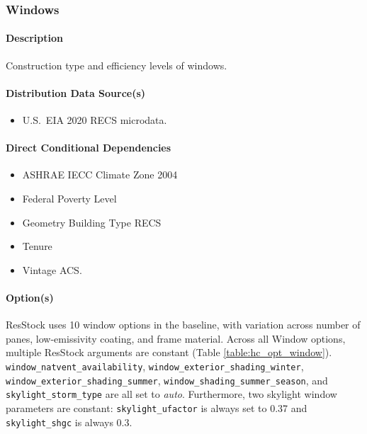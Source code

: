 \subsubsection{Windows}\label{windows}
\paragraph{Description}
Construction type and efficiency levels of windows.
\paragraph{Distribution Data Source(s)}
\begin{itemize}
 
\item
  U.S.~EIA 2020 RECS microdata.
\end{itemize}

\paragraph{Direct Conditional Dependencies}

\begin{itemize}
    \item ASHRAE IECC Climate Zone 2004
    \item Federal Poverty Level
    \item Geometry Building Type RECS
    \item Tenure
    \item Vintage ACS.
\end{itemize}

\paragraph{Option(s)}
ResStock uses 10 window options in the baseline, with variation across number of panes, low-emissivity coating, and frame material. Across all Window options, multiple ResStock arguments are constant (Table \ref{table:hc_opt_window}). \texttt{window\_natvent\_availability},
\texttt{window\_exterior\_shading\_winter}, 
\texttt{window\_exterior\_shading\_summer}, 
\texttt{window\_shading\_summer\_season}, and 
\texttt{skylight\_storm\_type} are all set to \textit{auto}. Furthermore, two skylight window parameters are constant: 
\texttt{skylight\_ufactor} is always set to 0.37
and \texttt{skylight\_shgc} is always 0.3.

